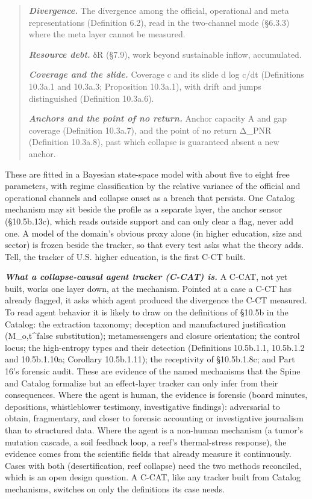 \documentclass[
]{article}
\begin{document}
\begin{quote}
\emph{\textbf{Divergence.}} The divergence among the official,
operational and meta representations (Definition 6.2), read in the
two-channel mode (§6.3.3) where the meta layer cannot be measured.

\emph{\textbf{Resource debt.}} δR (§7.9), work beyond sustainable
inflow, accumulated.

\emph{\textbf{Coverage and the slide.}} Coverage c and its slide d log
c/dt (Definitions 10.3a.1 and 10.3a.3; Proposition 10.3a.1), with drift
and jumps distinguished (Definition 10.3a.6).

\emph{\textbf{Anchors and the point of no return.}} Anchor capacity A
and gap coverage (Definition 10.3a.7), and the point of no return Δ\_PNR
(Definition 10.3a.8), past which collapse is guaranteed absent a new
anchor.
\end{quote}

These are fitted in a Bayesian state-space model with about five to
eight free parameters, with regime classification by the relative
variance of the official and operational channels and collapse onset as
a breach that persists. One Catalog mechanism may sit beside the profile
as a separate layer, the anchor sensor (§10.5b.13c), which reads outside
support and can only clear a flag, never add one. A model of the
domain's obvious proxy alone (in higher education, size and sector) is
frozen beside the tracker, so that every test asks what the theory adds.
Tell, the tracker of U.S. higher education, is the first C-CT built.

\emph{\textbf{What a collapse-causal agent tracker (C-CAT) is.}} A
C-CAT, not yet built, works one layer down, at the mechanism. Pointed at
a case a C-CT has already flagged, it asks which agent produced the
divergence the C-CT measured. To read agent behavior it is likely to
draw on the definitions of §10.5b in the Catalog: the extraction
taxonomy; deception and manufactured justification (M\_o,t\^{}false
substitution); metamessengers and closure orientation; the control
locus; the high-entropy types and their detection (Definitions
10.5b.1.1, 10.5b.1.2 and 10.5b.1.10a; Corollary 10.5b.1.11); the
receptivity of §10.5b.1.8c; and Part 16's forensic audit. These are
evidence of the named mechanisms that the Spine and Catalog formalize
but an effect-layer tracker can only infer from their consequences.
Where the agent is human, the evidence is forensic (board minutes,
depositions, whistleblower testimony, investigative findings):
adversarial to obtain, fragmentary, and closer to forensic accounting or
investigative journalism than to structured data. Where the agent is a
non-human mechanism (a tumor's mutation cascade, a soil feedback loop, a
reef's thermal-stress response), the evidence comes from the scientific
fields that already measure it continuously. Cases with both
(desertification, reef collapse) need the two methods reconciled, which
is an open design question. A C-CAT, like any tracker built from Catalog
mechanisms, switches on only the definitions its case needs.
\end{document}
